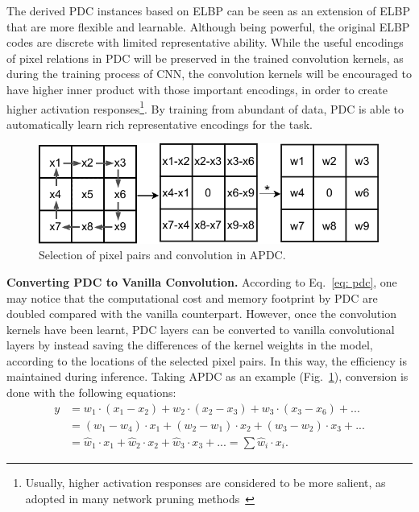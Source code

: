 \documentclass[10pt,twocolumn,letterpaper]{article}
\begin{document}
The derived PDC instances based on ELBP can be seen as an extension of ELBP that are more flexible and learnable. Although being powerful, the original ELBP codes are discrete with limited representative ability. While the useful encodings of pixel relations in PDC will be preserved in the trained convolution kernels, as during the training process of CNN, the convolution kernels will be encouraged to have higher inner product with those important encodings, in order to create higher activation responses\footnote{Usually, higher activation responses are considered to be more salient, as adopted in many network pruning methods~\cite{han2015deepcompression,su2020dynamic}}. By training from abundant of data, PDC is able to automatically learn rich representative encodings for the task. 

\begin{figure}[h]
    \centering
    \includegraphics[width=0.8\linewidth]{images/APDC.pdf}
    \caption{Selection of pixel pairs and convolution in APDC.}
    \label{fig:apdc}
\end{figure}

\vspace{0.3em}
\noindent \textbf{Converting PDC to Vanilla Convolution.} \quad
According to Eq.~\ref{eq: pdc}, one may notice that the computational cost and memory footprint by PDC are doubled compared with the vanilla counterpart. However, once the convolution kernels have been learnt, PDC layers can be converted to vanilla convolutional layers by instead saving the differences of the kernel weights in the model, according to the locations of the selected pixel pairs. In this way, the efficiency is maintained during inference. Taking APDC as an example (Fig.~\ref{fig:apdc}), conversion is done with the following equations:
{\small 
\begin{align}
    y &= w_{1}\cdot (x_1 - x_2) + w_2\cdot (x_2 - x_3)+w_3\cdot (x_3 - x_6) + ... \nonumber\\
    &=(w_1 - w_4)\cdot x_1 + (w_2 - w_1)\cdot x_2 + (w_3 - w_2)\cdot x_3 + ...\nonumber\\
    &=\hat{w}_1\cdot x_1 + \hat{w}_2\cdot x_2 + \hat{w}_3\cdot x_3 + ... =\sum \hat{w}_i\cdot x_i.
\end{align}
}
\end{document}
